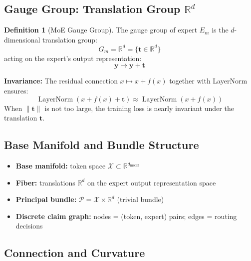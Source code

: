 \documentclass[12pt,a4paper]{article}
\theoremstyle{plain}
\theoremstyle{definition}
\newtheorem{definition}[theorem]{Definition}
\newcommand{\R}{\mathbb{R}}
\newcommand{\Xcal}{\mathcal{X}}
\newcommand{\Pcal}{\mathcal{P}}
\begin{document}
\subsection{Gauge Group: Translation Group $\R^d$}

\begin{definition}[MoE Gauge Group]
The gauge group of expert $E_m$ is the $d$-dimensional translation group:
\begin{equation}
    G_m = \R^d = \{\mathbf{t} \in \R^d\}
\end{equation}
acting on the expert's output representation:
\begin{equation}
    \mathbf{y} \mapsto \mathbf{y} + \mathbf{t}
\end{equation}

\textbf{Invariance:} The residual connection $x \mapsto x + f(x)$ together with LayerNorm ensures:
\begin{equation}
    \operatorname{LayerNorm}(x + f(x) + \mathbf{t}) \approx \operatorname{LayerNorm}(x + f(x))
\end{equation}
When $\|\mathbf{t}\|$ is not too large, the training loss is nearly invariant under the translation $\mathbf{t}$.
\end{definition}

\subsection{Base Manifold and Bundle Structure}

\begin{itemize}
    \item \textbf{Base manifold:} token space $\Xcal \subset \R^{d_{\text{model}}}$
    \item \textbf{Fiber:} translations $\R^d$ on the expert output representation space
    \item \textbf{Principal bundle:} $\Pcal = \Xcal \times \R^d$ (trivial bundle)
    \item \textbf{Discrete claim graph:} nodes = (token, expert) pairs; edges = routing decisions
\end{itemize}

\subsection{Connection and Curvature}
\end{document}
